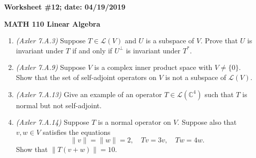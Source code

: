 \documentclass{article}
\newcommand{\CC}{\mathbb{C}}
\newcommand{\cL}{\mathcal{L}}
\begin{document}
{\bf Worksheet \#12; date: 04/19/2019}

{\bf MATH 110 Linear Algebra}

\begin{enumerate}
\item {\em (Axler 7.A.3)} Suppose $T \in \cL(V)$ and $U$ is a subspace of $V$. Prove that $U$ is invariant under $T$ if and only if $U^\perp$ is invariant under $T^*$.

\item {\em (Axler 7.A.9)} Suppose $V$ is a complex inner product space with $V \ne \{0\}$. Show that the set of self-adjoint operators on $V$ is not a subspace of $\cL(V)$.

\item {\em (Axler 7.A.13)} Give an example of an operator $T \in \cL(\CC^4)$ such that $T$ is normal but not self-adjoint.

\item {\em (Axler 7.A.14)} Suppose $T$ is a normal operator on $V$. Suppose also that $v, w \in V$ satisfies the equations
\[
	\|v\| = \|w\| = 2, \quad Tv = 3v, \quad Tw = 4w.
\]
Show that $\|T(v + w)\| = 10$.

\end{enumerate}
\end{document}
